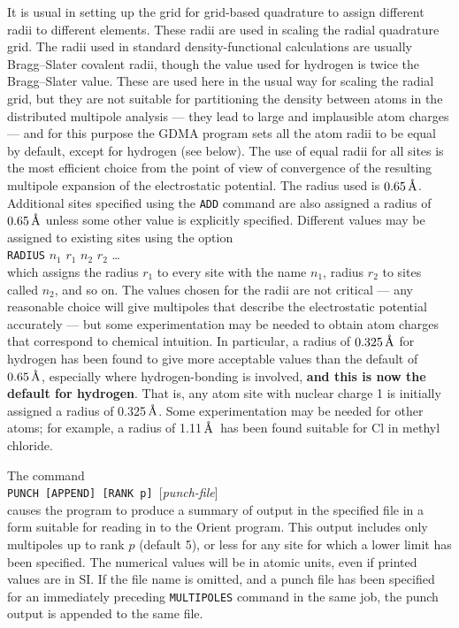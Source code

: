 \documentclass[12pt,txfonts]{paper}
\let\cite=\citep
\let\ring=\r
\newcommand{\angstrom}{\unskip\ensuremath{\,\hbox{\ring A}}}
\begin{document}
It is usual in setting up the grid for grid-based quadrature to assign
different radii to different elements. These radii are used in
scaling the radial quadrature grid\cite{MurrayHL93}. The radii used
in standard density-functional calculations are usually Bragg--Slater
covalent radii\cite{Slater64}, though the value used for hydrogen is
twice the Bragg--Slater value. These are used here in the usual way
for scaling the radial grid, but they are not suitable for
partitioning the density between atoms in the distributed multipole
analysis --- they 
lead to large and implausible atom charges --- and for this purpose
the GDMA program sets all the atom radii to be equal by 
default, except for hydrogen (see below). The use of equal radii for all sites is
the most efficient 
choice from the point of view of convergence of the resulting
multipole expansion of the electrostatic potential\cite{timf}. The
radius used is $0.65\angstrom$. Additional sites
specified using the \verb/ADD/ command are also assigned a radius of
$0.65\angstrom$ unless some other value is explicitly specified.
Different values may be assigned to existing sites using the option\\
\label{RADIUS}%
\hspace*{2 em}\verb/RADIUS/ $n_1$ $r_1$ $n_2$ $r_2$ \dots \\
which assigns the radius $r_1$ to every site with the name $n_1$,
radius $r_2$ to sites called $n_2$, and so on. The values chosen for
the radii are not critical --- any reasonable choice will give
multipoles that describe the electrostatic potential accurately ---
but some experimentation may be needed to obtain atom charges that
correspond to chemical intuition. In particular, a radius of
$0.325\angstrom$ for hydrogen has been found to give more acceptable
values than 
the default of $0.65\angstrom$, especially where hydrogen-bonding is
involved, \textbf{and this is now the default for hydrogen}.
That is, any atom site with nuclear charge 1 is initially assigned a
radius of 0.325\angstrom. Some experimentation may be needed for other
atoms; for example, a radius of 1.11\angstrom\ has been found suitable
for Cl in methyl chloride.

The command\\
\hspace*{2 em}\verb/PUNCH [APPEND] [RANK p] /[\emph{punch-file}]\\
causes the program to produce a summary of output in the specified
file in a form suitable for reading in to the Orient
program\cite{Orient5.0}. This output includes only multipoles up to
rank $p$ (default 5), or less for any site for which a lower limit has
been specified. The numerical 
values will be in atomic units, even if printed values are in SI. If
the file name is omitted, and a punch file has been specified for an
immediately preceding \verb/MULTIPOLES/ command in the same job, the
punch output is appended to the same file.
\end{document}
